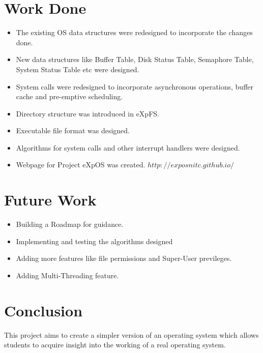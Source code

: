 \chapter{Work Done}
\label{chap10}
\begin {itemize}
\item The existing OS data structures were redesigned to incorporate the changes done. 
\item New data structures like Buffer Table, Disk Status Table, Semaphore Table, System Status Table etc were designed.
\item System calls were redesigned to incorporate asynchronous operations, buffer cache and pre-emptive scheduling.
\item Directory structure was introduced in eXpFS.
\item Executable file format was designed.
\item Algorithms for system calls and other interrupt handlers were designed.
\item Webpage for Project eXpOS was created. \texttt{$http://exposnitc.github.io/$}
\end{itemize}

\chapter{Future Work}
\label{chap11}
\begin {itemize}
\item Building a Roadmap for guidance.
\item Implementing and testing the algorithms designed
\item Adding more features like file permissions and Super-User previleges.
\item Adding Multi-Threading feature.
\end{itemize}

\chapter{Conclusion}
\label{chap12}
This project aims to create a simpler version of an operating system which allows students to acquire insight into the working of a real operating system.

